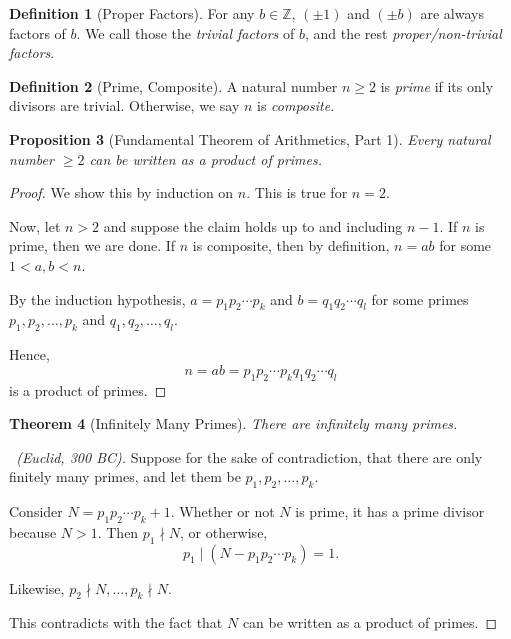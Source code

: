 \documentclass{article}
\newtheorem{theorem}{Theorem}[section]
\newtheorem{proposition}[theorem]{Proposition}
\theoremstyle{definition}
\newtheorem{definition}[theorem]{Definition}
\theoremstyle{remark}
\newcommand{\pqty}[1]{\left(#1\right)}
\newcommand{\divides}{\mid}
\newcommand{\notdivides}{\nmid}
\newcommand{\ZZ}{\mathbb{Z}}
\begin{document}
\begin{definition}[Proper Factors]
    For any \(b \in \ZZ\), \(\pqty{\pm 1}\) and \(\pqty{\pm b}\) are always factors of \(b\). We call those the \emph{trivial factors} of \(b\), and the rest \emph{proper/non-trivial factors}.
\end{definition}

\begin{definition}[Prime, Composite]
    A natural number \(n \geq 2\) is \emph{prime} if its only divisors are trivial. Otherwise, we say \(n\) is \emph{composite}.
\end{definition}

\begin{proposition}[Fundamental Theorem of Arithmetics, Part 1]
    Every natural number \(\geq 2\) can be written as a product of primes.
\end{proposition}

\begin{proof}
    We show this by induction on \(n\). This is true for \(n = 2\).

    Now, let \(n > 2\) and suppose the claim holds up to and including \(n - 1\). If \(n\) is prime, then we are done. If \(n\) is composite, then by definition, \(n = ab\) for some \(1 < a, b < n\).

    By the induction hypothesis, \(a = p_1 p_2 \cdots p_k\) and \(b = q_1 q_2 \cdots q_l\) for some primes \(p_1, p_2, \ldots, p_k\) and \(q_1, q_2, \ldots, q_l\).

    Hence,
    \[
        n = ab = p_1 p_2 \cdots p_k q_1 q_2 \cdots q_l
    \]
    is a product of primes.
\end{proof}

\begin{theorem}[Infinitely Many Primes]
    There are infinitely many primes.
\end{theorem}

\begin{proof}[\proofname\ (Euclid, 300 BC)]
    Suppose for the sake of contradiction, that there are only finitely many primes, and let them be \(p_1, p_2, \ldots, p_k\).

    Consider \(N = p_1 p_2 \cdots p_k + 1\). Whether or not \(N\) is prime, it has a prime divisor because \(N>1\). Then \(p_1 \notdivides N\), or otherwise,
    \[
        p_1 \divides \pqty{N - p_1 p_2 \cdots p_k} = 1.
    \]

    Likewise, \(p_2 \notdivides N, \ldots, p_k \notdivides N\).

    This contradicts with the fact that \(N\) can be written as a product of primes.
\end{proof}
\end{document}
